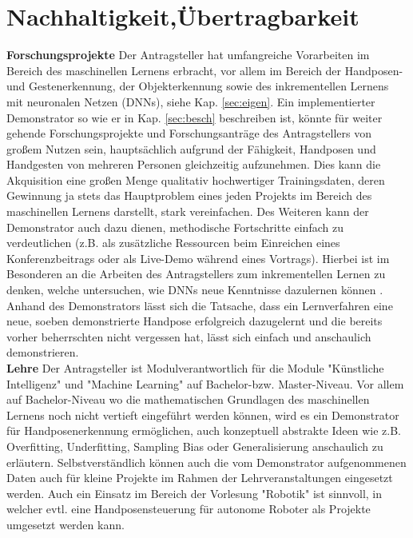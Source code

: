\documentclass[11pt]{article}
\begin{document}
\section{Nachhaltigkeit,Übertragbarkeit}\label{sec:ueber}
\textbf {Forschungsprojekte} Der Antragsteller hat umfangreiche Vorarbeiten im Bereich des maschinellen Lernens erbracht, vor allem im Bereich der Handposen- und Gestenerkennung, der Objekterkennung sowie des inkrementellen Lernens mit neuronalen Netzen (DNNs), siehe Kap. \ref{sec:eigen}.
Ein implementierter Demonstrator so wie er in Kap. \ref{sec:besch} beschreiben ist, könnte für weiter gehende Forschungsprojekte und Forschungsanträge des Antragstellers von großem Nutzen sein, hauptsächlich aufgrund der Fähigkeit, Handposen und Handgesten von mehreren Personen gleichzeitig aufzunehmen. Dies kann die Akquisition eine großen Menge qualitativ hochwertiger Trainingsdaten, deren Gewinnung ja stets das Hauptproblem eines jeden Projekts im Bereich des maschinellen Lernens darstellt, stark vereinfachen. Des Weiteren kann der Demonstrator auch dazu dienen, methodische Fortschritte einfach zu verdeutlichen (z.B. als zusätzliche Ressourcen beim Einreichen eines Konferenzbeitrags oder als Live-Demo während eines Vortrags). Hierbei ist im Besonderen an die Arbeiten des Antragstellers zum inkrementellen Lernen zu denken, welche untersuchen, wie DNNs neue Kenntnisse dazulernen können \cite{gepperth2017b,gepperth2018a,gepperth2016tut,gepperth2015bio}. Anhand des Demonstrators lässt sich die Tatsache, dass ein Lernverfahren eine neue, soeben demonstrierte Handpose erfolgreich dazugelernt und die bereits vorher beherrschten nicht vergessen hat, lässt sich einfach und anschaulich demonstrieren.\\

\textbf{Lehre}
Der Antragsteller ist Modulverantwortlich für die Module "Künstliche Intelligenz" und "Machine Learning" auf Bachelor-bzw. Master-Niveau. Vor allem auf Bachelor-Niveau wo die mathematischen Grundlagen des maschinellen Lernens noch nicht vertieft eingeführt werden können, wird es ein Demonstrator für Handposenerkennung ermöglichen, auch konzeptuell abstrakte Ideen wie z.B. Overfitting, Underfitting, Sampling Bias oder Generalisierung anschaulich zu erläutern. Selbstverständlich können auch die vom Demonstrator aufgenommenen Daten auch für kleine Projekte im Rahmen der Lehrveranstaltungen eingesetzt werden. Auch ein Einsatz im Bereich der Vorlesung "Robotik" ist sinnvoll, in welcher evtl. eine Handposensteuerung für autonome Roboter als Projekte umgesetzt werden kann.\\
\end{document}
